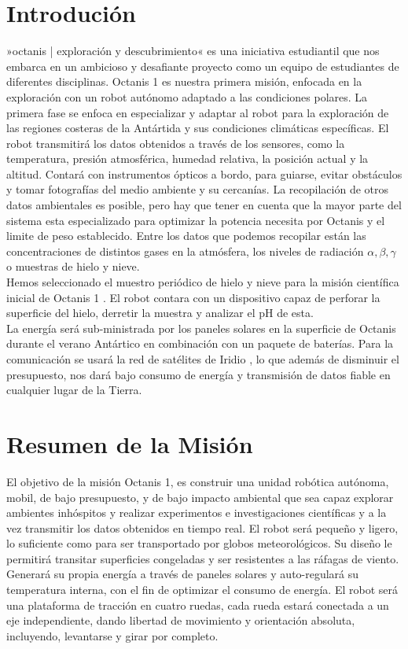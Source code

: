 \documentclass[a4paper,12pt]{article}
\begin{document}
\tableofcontents

\pagebreak

\section{Introdución}
»octanis | exploración y descubrimiento« \cite{octanis}  es una iniciativa estudiantil que nos embarca en un ambicioso y desafiante proyecto como un equipo de estudiantes de diferentes disciplinas. Octanis 1 es nuestra primera misión, enfocada en la exploración con un robot autónomo adaptado a las condiciones polares. La primera fase se enfoca en especializar y adaptar al robot para la exploración de las regiones costeras de la Antártida y sus condiciones climáticas específicas. El robot transmitirá los datos obtenidos a través de los sensores, como la temperatura, presión atmosférica, humedad relativa, la posición actual y la altitud. Contará con instrumentos ópticos a bordo, para guiarse, evitar obstáculos y tomar fotografías del medio ambiente y su cercanías. La recopilación de otros datos ambientales es posible, pero hay que tener en cuenta que la mayor parte del sistema esta especializado para optimizar la potencia necesita por Octanis y el limite de peso establecido. Entre los datos que podemos recopilar están las concentraciones de distintos gases en la atmósfera, los niveles de radiación $\alpha, \beta, \gamma$ o muestras de hielo y nieve. \\ Hemos seleccionado el muestro periódico de hielo y nieve para la misión científica inicial de Octanis 1 \cite{krishnakant}. El robot contara con un dispositivo capaz de perforar la superficie del hielo, derretir la muestra y analizar el pH de esta.
\\ La energía será sub-ministrada por los paneles solares en la superficie de Octanis durante el verano Antártico en combinación con un paquete de baterías. Para la comunicación se usará la red de satélites de Iridio \cite{iridium}, lo que además de disminuir el presupuesto, nos dará bajo consumo de energía y transmisión de datos fiable en cualquier lugar de la Tierra. 



\section{Resumen de la Misión}

El objetivo de la misión Octanis 1, es construir una unidad robótica autónoma, mobil, de bajo presupuesto, y de bajo impacto ambiental que sea capaz explorar ambientes inhóspitos y realizar experimentos e investigaciones científicas y a la vez transmitir los datos obtenidos en tiempo real. El robot será pequeño y ligero, lo suficiente como para ser transportado por globos meteorológicos. Su diseño le permitirá transitar superficies congeladas y ser resistentes a las ráfagas de viento. Generará su propia energía a través de paneles solares y auto-regulará su temperatura interna, con el fin de optimizar el consumo de energía. El robot será una plataforma de tracción en cuatro ruedas, cada rueda estará conectada a un eje independiente, dando libertad de movimiento y orientación absoluta, incluyendo, levantarse y girar por completo.
\end{document}
